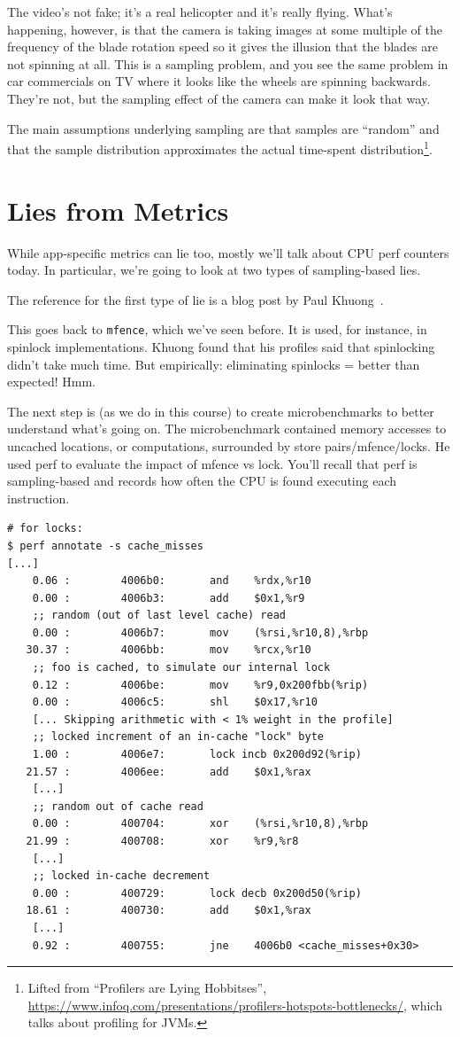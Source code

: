 \documentclass[a4paper]{report}
\begin{document}
The video's not fake; it's a real helicopter and it's really flying. What's happening, however, is that the camera is taking images at some multiple of the frequency of the blade rotation speed so it gives the illusion that the blades are not spinning at all. This is a sampling problem, and you see the same problem in car commercials on TV where it looks like the wheels are spinning backwards. They're not, but the sampling effect of the camera can make it look that way.

The main assumptions underlying sampling are that samples are ``random'' and that the sample distribution approximates the actual time-spent distribution\footnote{Lifted from ``Profilers are Lying Hobbitses'', \url{https://www.infoq.com/presentations/profilers-hotspots-bottlenecks/}, which talks about profiling for JVMs.}.

\section*{Lies from Metrics}
While app-specific metrics can lie too, mostly we'll talk about CPU
perf counters today.
In particular, we're going to look at two types of sampling-based lies.

The reference for the first type of lie is a blog post by Paul Khuong~\cite{metrics}.

This goes back to {\tt mfence}, which we've seen before. It is used, for instance, in
spinlock implementations. Khuong found that his profiles said that spinlocking didn't take much time.
But empirically: eliminating spinlocks = better than expected! Hmm.

The next step is (as we do in this course) to create microbenchmarks to better understand what's
going on. The microbenchmark contained memory accesses to uncached locations, or computations,
surrounded by store pairs/mfence/locks. He used perf to evaluate the impact of mfence vs lock.
You'll recall that perf is sampling-based and records how often the CPU is found executing each
instruction.

{\scriptsize
\begin{lstlisting}
# for locks:
$ perf annotate -s cache_misses
[...]
    0.06 :        4006b0:       and    %rdx,%r10
    0.00 :        4006b3:       add    $0x1,%r9
    ;; random (out of last level cache) read
    0.00 :        4006b7:       mov    (%rsi,%r10,8),%rbp
   30.37 :        4006bb:       mov    %rcx,%r10
    ;; foo is cached, to simulate our internal lock
    0.12 :        4006be:       mov    %r9,0x200fbb(%rip)
    0.00 :        4006c5:       shl    $0x17,%r10
    [... Skipping arithmetic with < 1% weight in the profile]
    ;; locked increment of an in-cache "lock" byte
    1.00 :        4006e7:       lock incb 0x200d92(%rip)
   21.57 :        4006ee:       add    $0x1,%rax
    [...]
    ;; random out of cache read
    0.00 :        400704:       xor    (%rsi,%r10,8),%rbp
   21.99 :        400708:       xor    %r9,%r8
    [...]
    ;; locked in-cache decrement
    0.00 :        400729:       lock decb 0x200d50(%rip)
   18.61 :        400730:       add    $0x1,%rax
    [...]
    0.92 :        400755:       jne    4006b0 <cache_misses+0x30>
\end{lstlisting}
}
\end{document}
